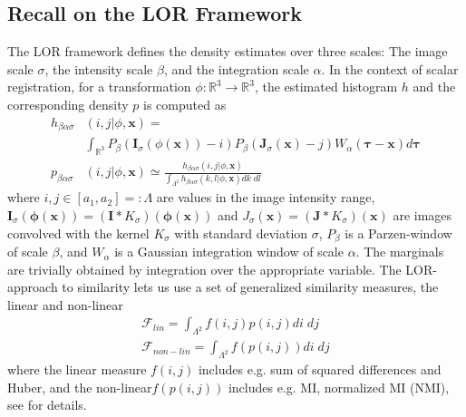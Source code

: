 \documentclass[twocolumn]{svjour3}
\begin{document}
\subsection{Recall on the LOR Framework}
The LOR framework defines the density estimates over three scales: The image scale
$\sigma$, the intensity scale $\beta$, and the integration scale $\alpha$. In the context
of scalar registration, for a transformation $\phi:\mathbb{R}^3\rightarrow\mathbb{R}^3$,
the estimated histogram $h$ and the corresponding density $p$ is computed as
\begin{align}
\label{eq:loih}
  h_{\beta\alpha\sigma}&(i,j|\phi,\bm x)=\\
                 &\int_{\mathbb R^3}P_\beta( \bm I_{\sigma}(\phi(\bm x))-i)
                   P_\beta( \bm J_{\sigma}(\bm x)-j)W_\alpha(\bm \tau-\bm x)d\bm \tau\nonumber \\
  \label{eq:loipdf}
  p_{\beta\alpha\sigma}&(i,j|\phi,\bm x)\simeq \frac{h_{\beta\alpha\sigma}(i,j|\phi,\bm x)}
                         {\int_{\Lambda^2} h_{\beta\alpha\sigma}(k,l|\phi,\bm x)dk\; dl}
\end{align} 
where $i,j\in[a_1, a_2] =: \Lambda$ are values in the image intensity range,
$\bm I_{\sigma}(\bm \phi(\bm x))=(\bm I*K_\sigma)(\bm \phi(\bm x))$ and
$ J_{\sigma}(\bm x)=(\bm J*K_\sigma)(\bm x)$ are images convolved with the kernel
$K_\sigma$ with standard deviation $\sigma$, $P_\beta$ is a Parzen-window of scale
$\beta$, and $W_\alpha$ is a Gaussian integration window of scale $\alpha$. The marginals
are trivially obtained by integration over the appropriate variable.  The LOR-approach to
similarity lets us use a set of generalized similarity measures, the linear and non-linear
\begin{align}\label{eq:sim}
  \mathcal{F}_{lin}=\int_{\Lambda^2}f(i,j)p(i,j)di\; dj\\ \mathcal{F}_{non-lin}=\int_{\Lambda^2}f(p(i,j))di\; dj
\end{align}
where the linear measure $f(i,j)$ includes e.g. sum of squared differences and Huber, and
the non-linear\linebreak $f(p(i,j))$ includes e.g. MI, normalized MI (NMI), see
\cite{darknersporring2012pami} for details.
\end{document}
